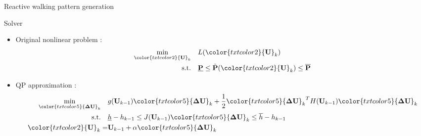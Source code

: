 \begin{frame}{Reactive walking pattern generation }

\end{frame}



\begin{frame}{Solver}

\begin{itemize}
\item Original nonlinear problem :
  \begin{align*}
    \min_{\color{txtcolor2}{\bf U}_k}  \quad & L({\color{txtcolor2}{\bf U}_k}) \\
    \text{s.t.} \quad & \underline{\bf P} \leq \tilde{\bf P}({\color{txtcolor2}{\bf U}_k}) \leq \overline{\bf P}
  \end{align*}
\item QP approximation :
  \begin{align*}
    \min_{{\color{txtcolor5}{\bf \Delta U}_k}} \quad &
    g({\bf U}_{k-1}) {\color{txtcolor5}{\bf \Delta U}_k} +
    \frac{1}{2} {\color{txtcolor5}{\bf \Delta U}_k}^T H({\bf U}_{k-1}) {\color{txtcolor5}{\bf \Delta U}_k} \\
    \text{s.t.} \quad & \underline{h} - h_{k-1} \leq J({\bf U}_{k-1}) {\color{txtcolor5}{\bf \Delta U}_k} \leq \overline{h} - h_{k-1}\\
    {\color{txtcolor2}{\bf U}_k} =& {\bf U}_{k-1} + \alpha {\color{txtcolor5}{\bf \Delta U}_k}
  \end{align*}
\end{itemize}
\end{frame}

